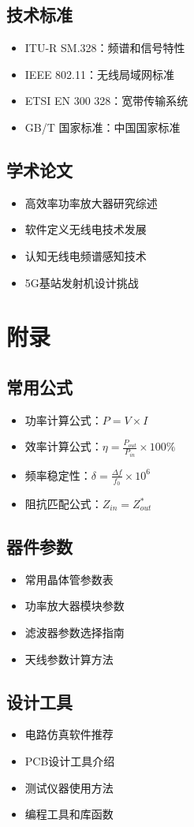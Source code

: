 \documentclass[12pt,UTF8]{ctexbook}
\begin{document}
\section{技术标准}
\begin{itemize}[leftmargin=3.5em]
    \item ITU-R SM.328：频谱和信号特性
    \item IEEE 802.11：无线局域网标准
    \item ETSI EN 300 328：宽带传输系统
    \item GB/T 国家标准：中国国家标准
\end{itemize}

\section{学术论文}
\begin{itemize}[leftmargin=3.5em]
    \item 高效率功率放大器研究综述
    \item 软件定义无线电技术发展
    \item 认知无线电频谱感知技术
    \item 5G基站发射机设计挑战
\end{itemize}

\chapter{附录}

\section{常用公式}
\begin{itemize}[leftmargin=3.5em]
    \item 功率计算公式：$P = V \times I$
    \item 效率计算公式：$\eta = \frac{P_{out}}{P_{in}} \times 100\%$
    \item 频率稳定性：$\delta = \frac{\Delta f}{f_0} \times 10^6$
    \item 阻抗匹配公式：$Z_{in} = Z_{out}^*$
\end{itemize}

\section{器件参数}
\begin{itemize}[leftmargin=3.5em]
    \item 常用晶体管参数表
    \item 功率放大器模块参数
    \item 滤波器参数选择指南
    \item 天线参数计算方法
\end{itemize}

\section{设计工具}
\begin{itemize}[leftmargin=3.5em]
    \item 电路仿真软件推荐
    \item PCB设计工具介绍
    \item 测试仪器使用方法
    \item 编程工具和库函数
\end{itemize}
\end{document}
